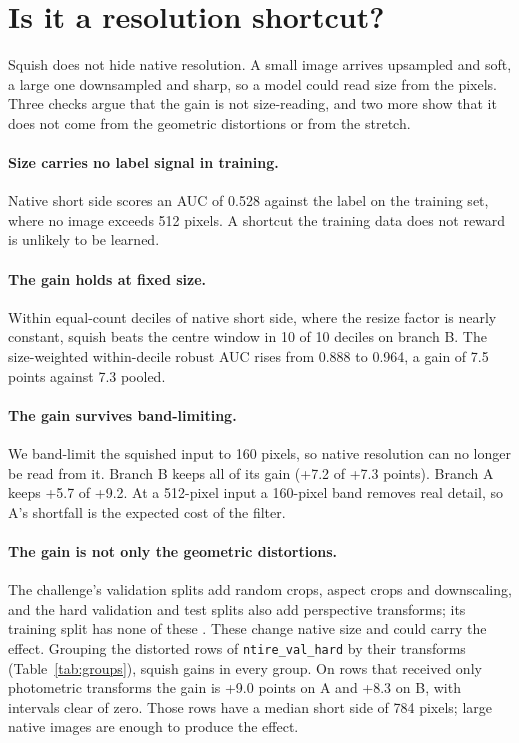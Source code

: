 \documentclass[letterpaper]{article} %
\begin{document}
\section{Is it a resolution shortcut?}
\label{sec:controls}

Squish does not hide native resolution. A small image arrives upsampled and
soft, a large one downsampled and sharp, so a model could read size from the
pixels. Three checks argue that the gain is not size-reading, and two more
show that it does not come from the geometric distortions or from the
stretch.

\paragraph{Size carries no label signal in training.} Native short side scores
an AUC of 0.528 against the label on the training set, where no image exceeds
512 pixels. A shortcut the training data does not reward is unlikely to be
learned.

\paragraph{The gain holds at fixed size.} Within equal-count deciles of native
short side, where the resize factor is nearly constant, squish beats the
centre window in 10 of 10 deciles on branch B. The size-weighted
within-decile robust AUC rises from 0.888 to 0.964, a gain of 7.5 points
against 7.3 pooled.

\paragraph{The gain survives band-limiting.} We band-limit the squished input
to 160 pixels, so native resolution can no longer be read from it. Branch B
keeps all of its gain (+7.2 of +7.3 points). Branch A keeps +5.7 of +9.2. At a
512-pixel input a 160-pixel band removes real detail, so A's shortfall is the
expected cost of the filter.

\paragraph{The gain is not only the geometric distortions.} The challenge's
validation splits add random crops, aspect crops and downscaling, and the
hard validation and test splits also add perspective transforms; its training
split has none of these \cite{gushchin2026ntire}.
These change native size and could carry the effect. Grouping the distorted
rows of \texttt{ntire\_val\_hard} by their transforms
(Table~\ref{tab:groups}), squish gains in every group. On rows that received
only photometric transforms the gain is +9.0 points on A and +8.3 on B, with
intervals clear of zero. Those rows have a median short side of 784 pixels;
large native images are enough to produce the effect.
\end{document}
